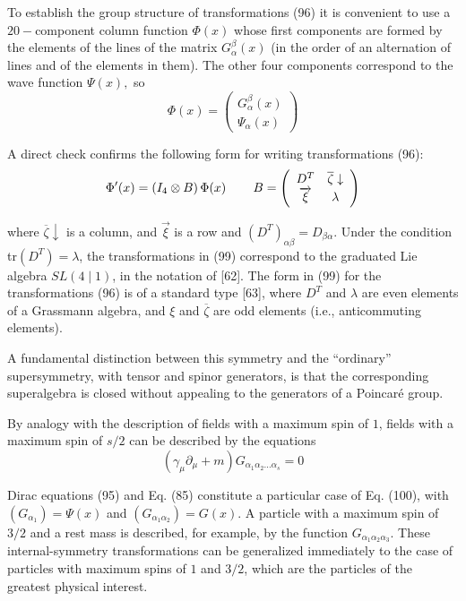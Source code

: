 \documentclass[a4paper,12pt]{article}
\begin{document}
To establish the group structure of transformations (96) it is convenient to
use a $20-$component column function $\Phi (x)$ whose first components are
formed by the elements of the lines of the matrix $G_\alpha ^\beta (x)$ (in
the order of an alternation of lines and of the elements in them). The other
four components correspond to the wave function $\Psi (x),$ so
\begin{equation}
\Phi (x)=\left(
\begin{array}{c}
G_\alpha ^\beta (x) \\
\Psi _\alpha (x)
\end{array}
\right)  \label{98}
\end{equation}

A direct check confirms the following form for writing transformations (96):
\begin{equation}
\Phi ^{\prime }(x)=\left( I_4\otimes B\right) \Phi (x)\hspace{0.3in}B=\left(
\begin{array}{cc}
D^T & \overline{\zeta }\downarrow \\
\overrightarrow{\xi } & \lambda
\end{array}
\right)  \label{99}
\end{equation}

where $\overline{\zeta }\downarrow $ is a column, and
$\overrightarrow{\xi }$ is a row and $\left( D^T\right) _{\alpha
\beta }=D_{\beta \alpha }$. Under the condition tr$\left(
D^T\right) =\lambda $, the transformations in (99) correspond to
the graduated Lie algebra $SL(4\mid 1)$, in the notation of [62].
The form in (99) for the transformations (96) is of a standard
type [63], where $D^T$ and $\lambda $ are even elements of a
Grassmann algebra, and $\xi $ and $\overline{\zeta }$ are odd
elements (i.e., anticommuting elements).

A fundamental distinction between this symmetry and the ``ordinary''
supersymmetry, with tensor and spinor generators, is that the corresponding
superalgebra is closed without appealing to the generators of a Poincar\'e
group.

By analogy with the description of fields with a maximum spin of $1$, fields
with a maximum spin of $s/2$ can be described by the equations
\begin{equation}
\left( \gamma _\mu \partial _\mu +m\right) G_{\alpha _1\alpha _2...\alpha
_s}=0  \label{100}
\end{equation}

Dirac equations (95) and Eq. (85) constitute a particular case of Eq. (100),
with $(G_{\alpha _1})=\Psi (x)$ and $(G_{\alpha _1\alpha _2})=G(x)$. A
particle with a maximum spin of $3/2$ and a rest mass is described, for
example, by the function $G_{\alpha _1\alpha _2\alpha _3}$. These
internal-symmetry transformations can be generalized immediately to the case
of particles with maximum spins of $1$ and $3/2$, which are the particles of
the greatest physical interest.
\end{document}
